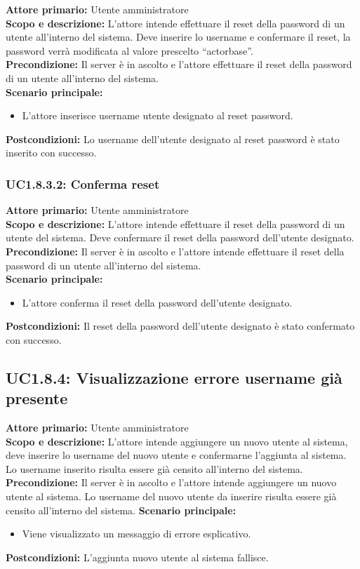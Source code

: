 \documentclass{scalatekids-article}
\begin{document}
\textbf{Attore primario:} Utente amministratore\\
\textbf{Scopo e descrizione:} L'attore intende effettuare il reset della password di un utente all'interno del sistema. Deve inserire lo username e confermare il reset, la password
verrà modificata al valore prescelto ``actorbase''.\\
\textbf{Precondizione:} Il server è in ascolto e l'attore effettuare il reset della password di un utente all'interno del sistema.\\
\textbf{Scenario principale:}
\begin{itemize}
\item L'attore inserisce username utente designato al reset password.
\end{itemize}
\textbf{Postcondizioni:} Lo username dell'utente designato al reset password è stato inserito con successo.

\subsubsection{UC1.8.3.2: Conferma reset}

\textbf{Attore primario:} Utente amministratore\\
\textbf{Scopo e descrizione:} L'attore intende effettuare il reset della password di un utente del sistema. Deve confermare il reset della password dell'utente designato.\\
\textbf{Precondizione:} Il server è in ascolto e l'attore intende effettuare il reset della password di un utente all'interno del sistema.\\
\textbf{Scenario principale:}
\begin{itemize}
\item L'attore conferma il reset della password dell'utente designato.
\end{itemize}
\textbf{Postcondizioni:} Il reset della password dell'utente designato è stato confermato con successo.

\subsection{UC1.8.4: Visualizzazione errore username già presente}

\textbf{Attore primario:} Utente amministratore\\
\textbf{Scopo e descrizione:} L'attore intende aggiungere un nuovo utente al sistema, deve inserire lo username del nuovo utente e confermarne l'aggiunta al sistema.
Lo username inserito risulta essere già censito all'interno del sistema.
\textbf{Precondizione:} Il server è in ascolto e l'attore intende aggiungere un nuovo utente al sistema. Lo username del nuovo utente da inserire risulta essere già
censito all'interno del sistema.
\textbf{Scenario principale:}
\begin{itemize}
\item Viene visualizzato un messaggio di errore esplicativo.
\end{itemize}
\textbf{Postcondizioni:} L'aggiunta nuovo utente al sistema fallisce.
\end{document}
